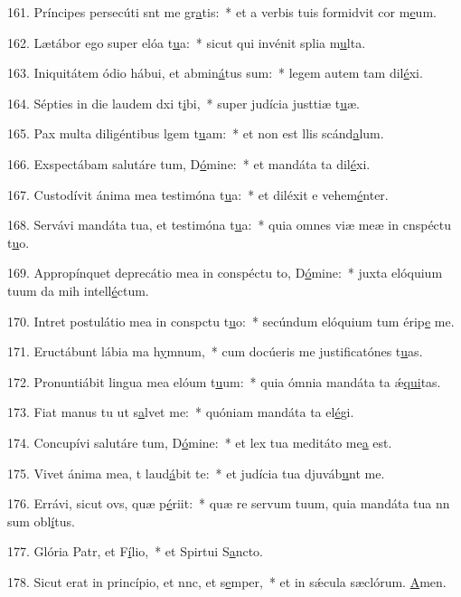 161. Príncipes persecúti snt me gr\uline{a}tis:~* et a verbis tuis formidvit cor m\uline{e}um.\par 
162. Lætábor ego super elóa t\uline{u}a:~* sicut qui invénit splia m\uline{u}lta.\par 
163. Iniquitátem ódio hábui, et abmin\uline{á}tus sum:~* legem autem tam dil\uline{é}xi.\par 
164. Sépties in die laudem dxi t\uline{i}bi,~* super judícia justtiæ t\uline{u}æ.\par 
165. Pax multa diligéntibus lgem t\uline{u}am:~* et non est llis scánd\uline{a}lum.\par 
166. Exspectábam salutáre tum, D\uline{ó}mine:~* et mandáta ta dil\uline{é}xi.\par 
167. Custodívit ánima mea testimóna t\uline{u}a:~* et diléxit e vehem\uline{é}nter.\par 
168. Servávi mandáta tua, et testimóna t\uline{u}a:~* quia omnes viæ meæ in cnspéctu t\uline{u}o.\par 
169. Appropínquet deprecátio mea in conspéctu to, D\uline{ó}mine:~* juxta elóquium tuum da mih intell\uline{é}ctum.\par 
170. Intret postulátio mea in conspctu t\uline{u}o:~* secúndum elóquium tum érip\uline{e} me.\par 
171. Eructábunt lábia ma h\uline{y}mnum,~* cum docúeris me justificatónes t\uline{u}as.\par 
172. Pronuntiábit lingua mea elóum t\uline{u}um:~* quia ómnia mandáta ta ǽ\uline{qui}tas.\par 
173. Fiat manus tu ut s\uline{a}lvet me:~* quóniam mandáta ta el\uline{é}gi.\par 
174. Concupívi salutáre tum, D\uline{ó}mine:~* et lex tua meditáto me\uline{a} est.\par 
175. Vivet ánima mea, t laud\uline{á}bit te:~* et judícia tua djuváb\uline{u}nt me.\par 
176. Errávi, sicut ovs, quæ p\uline{é}riit:~* quæ re servum tuum, quia mandáta tua nn sum obl\uline{í}tus.\par 
177. Glória Patr, et F\uline{í}lio,~* et Spirtui S\uline{a}ncto.\par 
178. Sicut erat in princípio, et nnc, et s\uline{e}mper,~* et in sǽcula sæclórum. \uline{A}men.\par 

